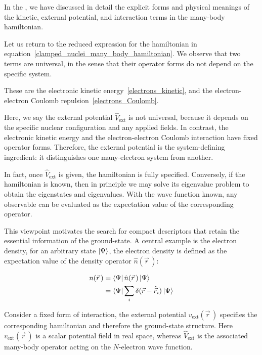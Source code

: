 In the ,
we have discussed in detail the explicit forms and physical meanings of the kinetic, external potential, and interaction terms in the many-body hamiltonian.

Let us return to the reduced expression for the hamiltonian in equation~\eqref{clamped_nuclei_many_body_hamiltonian}.
We observe that two terms are universal, in the sense that their operator forms do not depend on the specific system.

These are the electronic kinetic energy~\eqref{electrons_kinetic},
and the electron-electron Coulomb repulsion~\eqref{electrons_Coulomb}.

Here, we say the external potential $\hat{V}_\mathrm{ext}$ is not universal, because it depends on the specific nuclear configuration and any applied fields. In contrast, the electronic kinetic energy and the electron-electron Coulomb interaction have fixed operator forms.
Therefore, the external potential is the system-defining ingredient: it distinguishes one many-electron system from another.

In fact, once $\hat{V}_\mathrm{ext}$ is given, the hamiltonian is fully specified.
Conversely, if the hamiltonian is known, then in principle we may solve its eigenvalue problem to obtain the eigenstates and eigenvalues.
With the wave function known, any observable can be evaluated as the expectation value of the corresponding operator.

This viewpoint motivates the search for compact descriptors that retain the essential information of the ground-state.
A central example is the electron density, for an arbitrary state $\ket{\Psi}$, the electron density is defined as the expectation value of the density operator $\hat{n}(\vec{r}\,)$:

\begin{equation}
\begin{aligned}
   n(\vec{r}\,)&=\bra{\Psi}\hat{n}(\vec{r}\,)\ket{\Psi} \\
   &=\bra{\Psi}\sum_i \delta(\vec{r}-\hat{\vec{r}}_i)\ket{\Psi}
\end{aligned}
\label{electron_densit_via_expectation}
\end{equation}

Consider a fixed form of interaction, the external potential $v_\mathrm{ext}(\vec{r}\,)$ specifies the corresponding hamiltonian and therefore the ground-state structure.
Here $v_\mathrm{ext}(\vec{r}\,)$ is a scalar potential field in real space, whereas $\hat{V}_\mathrm{ext}$ is the associated many-body operator acting on the $N$-electron wave function.

